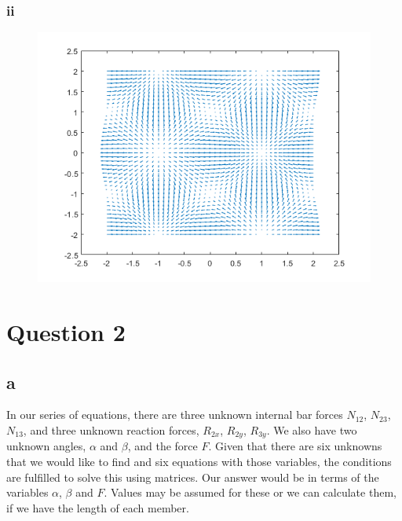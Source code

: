 \documentclass[11pt]{article}
\numberwithin{equation}{section}
\begin{document}
\subsubsection{ii}
\begin{figure}[H]
    \centering
    \includegraphics[width = 0.75 \textwidth]{./img/q1fii.png}
    \caption{}
\end{figure}

\section{Question 2}
\subsection{a}
In our series of equations, there are three unknown internal bar forces $N_{12}$, $N_{23}$, $N_{13}$, and three unknown reaction forces, $R_{2x}$, $R_{2y}$, $R_{3y}$. We also have two unknown angles, $\alpha$ and $\beta$, and the force $F$. Given that there are six unknowns that we would like to find and six equations with those variables, the conditions are fulfilled to solve this using matrices. Our answer would be in terms of the variables $\alpha$, $\beta$ and $F$. Values may be assumed for these or we can calculate them, if we have the length of each member.
\end{document}

